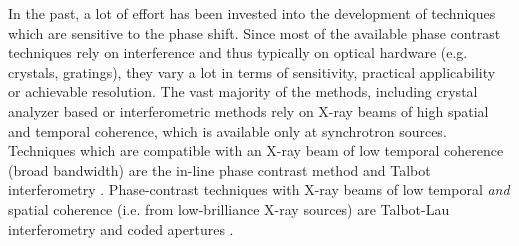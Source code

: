 \documentclass[aip,apl,amsmath,amssymb,floatfix,reprint,a4paper]{revtex4-1}
\begin{document}
% 
% 
% 
% 
% 
% 

In the past, a lot of effort has been invested into the development of techniques which are sensitive to the phase shift. Since most of the available phase contrast techniques rely on interference and thus typically on optical hardware (e.g. crystals, gratings), they vary a lot in terms of sensitivity, practical applicability or achievable resolution. The vast majority of the methods, including crystal analyzer based \cite{Davis1995,Chapman1997} or interferometric \cite{Bonse1965,Momose1996} methods rely on X-ray beams of high spatial and temporal coherence, which is available only at synchrotron sources. Techniques which are compatible with an X-ray beam of low temporal coherence (broad bandwidth) are the in-line phase contrast method \cite{Snigirev1995,Wilkins1996,Cloetens1996} and Talbot interferometry \cite{Cloetens1997,David2002,Momose2003a}. Phase-contrast techniques with X-ray beams of low temporal \textit{and} spatial coherence (i.e. from low-brilliance X-ray sources) are Talbot-Lau interferometry \cite{Pfeiffer2006} and coded apertures \cite{Munro2012}.
\end{document}
